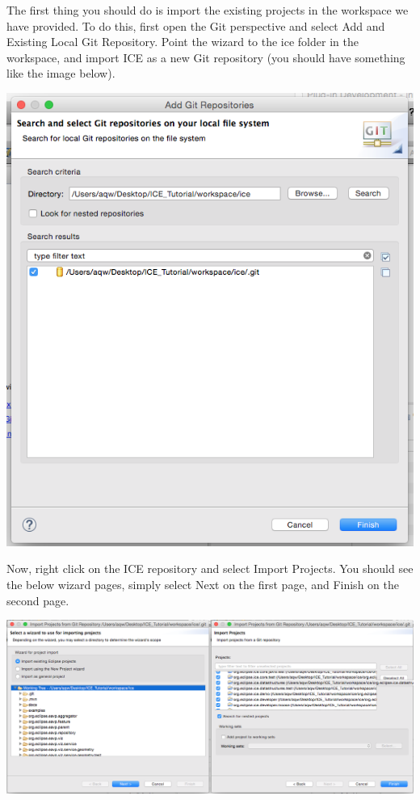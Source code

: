 The first thing you should do is import the existing projects in the workspace
we have provided. To do this, first open the Git perspective and select Add and
Existing Local Git Repository. Point the wizard to the ice folder in the
workspace, and import ICE as a new Git repository (you should have something
like the image below).
\begin{center} \includegraphics[width=\textwidth]{figures/clone} \end{center}
Now, right click on the ICE repository and select Import Projects. You should
see the below wizard pages, simply select Next on the first page, and Finish on
the second page.
\begin{center} \includegraphics[width=\textwidth]{figures/importProjects}
\end{center}

